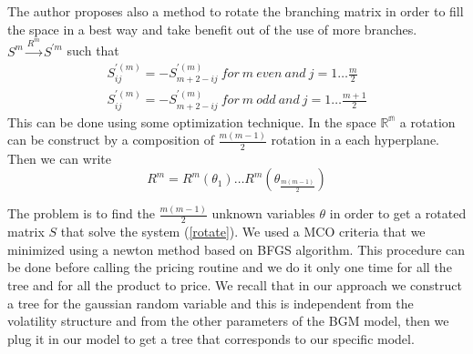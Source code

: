The author proposes also a method to rotate the branching matrix in order to fill the space in a best way and take benefit out of the use of more branches.
$ S^{m} \stackrel{R^m}{\rightarrow}S^{'m}$ such that
\begin{eqnarray}\label{rotate}
 S^{'(m)}_{i j}=-S^{'(m)}_{m+2-i j}\ for \ m \ even \ and \ j=1\ldots \frac{m}{2}\\
 S^{'(m)}_{i j}=-S^{'(m)}_{m+2-i j}\ for \ m \ odd \ and \ j=1\ldots \frac{m+1}{2}
\end{eqnarray}
This can be done using some optimization technique. In the space $\mathbb{R^{m}}$ a rotation can be construct by a composition of $\frac{m(m-1)}{2}$ rotation in a each hyperplane. Then we can write 
\begin{equation}
R^m = R^{m}(\theta_1) \ldots R^{m}(\theta_{\frac{m(m-1)}{2} } )
\end{equation}

The problem is to find the $\frac{m(m-1)}{2}$ unknown variables $\theta$ in order to get a rotated matrix $S$ that solve the system (\ref{rotate}). We used a MCO criteria that we minimized using a newton method based on BFGS algorithm. This procedure can be done before calling the pricing routine and we do it only one time for all the tree and for all the product to price. We recall that in our approach we construct a tree for the gaussian random variable and this is independent from the volatility structure and from the other parameters of the BGM model, then we plug it in our model to get a tree that corresponds to our specific model.

